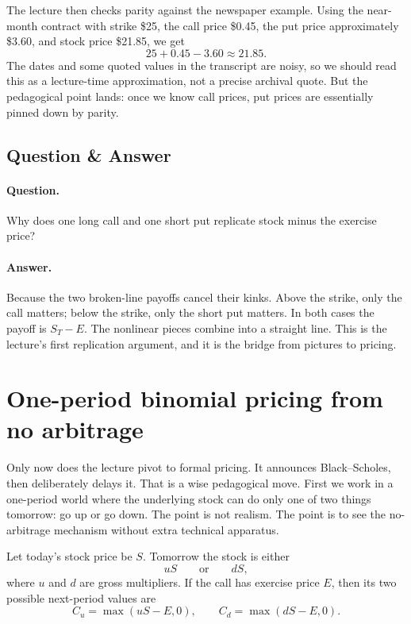 The lecture then checks parity against the newspaper example. Using the near-month contract with strike \$25, the call price \$0.45, the put price approximately \$3.60, and stock price \$21.85, we get
\begin{equation}
25+0.45-3.60\approx 21.85.
\end{equation}
The dates and some quoted values in the transcript are noisy, so we should read this as a lecture-time approximation, not a precise archival quote. But the pedagogical point lands: once we know call prices, put prices are essentially pinned down by parity.

\subsection{Question \& Answer}

\paragraph{Question.} Why does one long call and one short put replicate stock minus the exercise price?

\paragraph{Answer.} Because the two broken-line payoffs cancel their kinks. Above the strike, only the call matters; below the strike, only the short put matters. In both cases the payoff is $S_T-E$. The nonlinear pieces combine into a straight line. This is the lecture's first replication argument, and it is the bridge from pictures to pricing.

\section{One-period binomial pricing from no arbitrage}

Only now does the lecture pivot to formal pricing. It announces Black--Scholes, then deliberately delays it. That is a wise pedagogical move. First we work in a one-period world where the underlying stock can do only one of two things tomorrow: go up or go down. The point is not realism. The point is to see the no-arbitrage mechanism without extra technical apparatus.

Let today's stock price be $S$. Tomorrow the stock is either
\begin{equation}
uS \qquad \text{or} \qquad dS,
\end{equation}
where $u$ and $d$ are gross multipliers. If the call has exercise price $E$, then its two possible next-period values are
\begin{equation}
C_u=\max(uS-E,0),\qquad C_d=\max(dS-E,0).
\end{equation}

